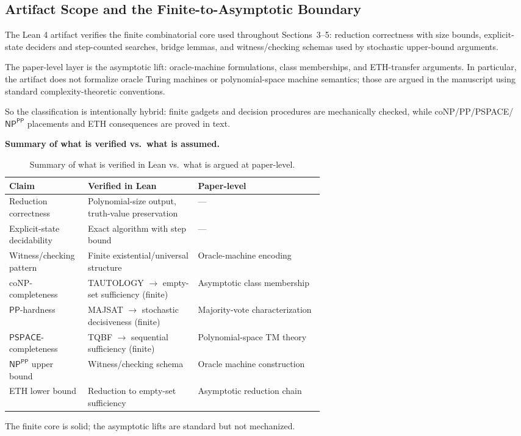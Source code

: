 \subsection{Artifact Scope and the Finite-to-Asymptotic Boundary}\label{sec:artifact-scope}

The Lean 4 artifact verifies the finite combinatorial core used throughout Sections~3--5: reduction correctness with size bounds, explicit-state deciders and step-counted searches, bridge lemmas, and witness/checking schemas used by stochastic upper-bound arguments.

The paper-level layer is the asymptotic lift: oracle-machine formulations, class memberships, and ETH-transfer arguments. In particular, the artifact does not formalize oracle Turing machines or polynomial-space machine semantics; those are argued in the manuscript using standard complexity-theoretic conventions.

So the classification is intentionally hybrid: finite gadgets and decision procedures are mechanically checked, while coNP/PP/PSPACE/$\mathsf{NP}^{\mathsf{PP}}$ placements and ETH consequences are proved in text.

\bigskip
\noindent\textbf{Summary of what is verified vs.\ what is assumed.}

\begin{table}[h]
\centering
\small
\setlength{\tabcolsep}{4pt}
\newcommand{\arraystretch}{1.12}
\newcommand{\tabularxcolumn}[1]{m{#1}}
\begin{tabularx}{\linewidth}{@{}>{\RaggedRight\arraybackslash}m{0.25\linewidth}>{\RaggedRight\arraybackslash}m{0.35\linewidth}>{\RaggedRight\arraybackslash}X@{}}
\toprule
\textbf{Claim} & \textbf{Verified in Lean} & \textbf{Paper-level} \\
\midrule
Reduction correctness & Polynomial-size output, truth-value preservation & --- \\
\midrule
Explicit-state decidability & Exact algorithm with step bound & --- \\
\midrule
Witness/checking pattern & Finite existential/universal structure & Oracle-machine encoding \\
\midrule
coNP-completeness & TAUTOLOGY $\to$ empty-set sufficiency (finite) & Asymptotic class membership \\
\midrule
$\mathsf{PP}$-hardness & MAJSAT $\to$ stochastic decisiveness (finite) & Majority-vote characterization \\
\midrule
$\mathsf{PSPACE}$-completeness & TQBF $\to$ sequential sufficiency (finite) & Polynomial-space TM theory \\
\midrule
$\mathsf{NP}^{\mathsf{PP}}$ upper bound & Witness/checking schema & Oracle machine construction \\
\midrule
ETH lower bound & Reduction to empty-set sufficiency & Asymptotic reduction chain \\
\bottomrule
\end{tabularx}
\caption{Summary of what is verified in Lean vs.\ what is argued at paper-level.}
\label{tab:artifact-scope}
\end{table}

The finite core is solid; the asymptotic lifts are standard but not mechanized.
